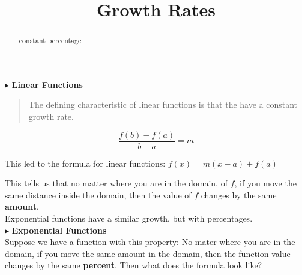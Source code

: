 \documentclass{ximera}
\title{Growth Rates}
\begin{document}
\begin{abstract}
constant percentage
\end{abstract}
\maketitle










$\blacktriangleright$ \textbf{\textcolor{purple!85!blue}{Linear Functions}}   \\


\begin{quote}
The defining characteristic of linear functions is that the have a constant growth rate.
\end{quote}





\[   \frac{f(b)-f(a)}{b-a} = m       \]

This led to the formula for linear functions:  $f(x) = m(x-a) + f(a)$


This tells us that no matter where you are in the domain, of $f$, if you move the same distance inside the domain, then the value of $f$ changes by the same \textbf{\textcolor{purple!85!blue}{amount}}. \\


Exponential functions have a similar growth, but with percentages. \\



$\blacktriangleright$ \textbf{\textcolor{purple!85!blue}{Exponential Functions}} \\



Suppose we have a function with this property:  No mater where you are in the domain, if you move the same amount in the domain, then the function value changes by the same \textbf{\textcolor{purple!85!blue}{percent}}.  Then what does the formula look like?
\end{document}
